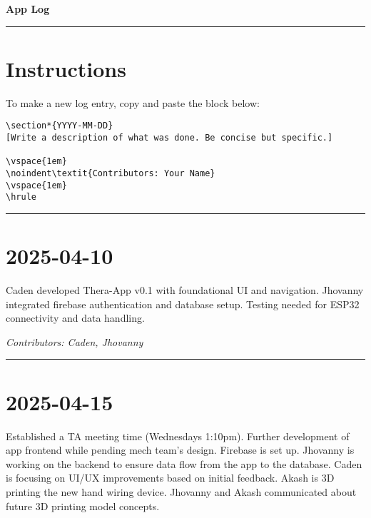 \documentclass[12pt]{article}
\begin{document}
\begin{center}
    {\Huge\bfseries App Log}
\end{center}
\vspace{1em}
\hrule
\vspace{1em}

\section*{Instructions}
To make a new log entry, copy and paste the block below:

\begin{verbatim}
\section*{YYYY-MM-DD}
[Write a description of what was done. Be concise but specific.]

\vspace{1em}
\noindent\textit{Contributors: Your Name}
\vspace{1em}
\hrule
\end{verbatim}

\vspace{1em}
\hrule
\vspace{1em}


\section*{2025-04-10}
Caden developed Thera-App v0.1 with foundational UI and navigation. Jhovanny integrated firebase authentication and database setup. Testing needed for ESP32 connectivity and data handling.

\vspace{1em}
\noindent\textit{Contributors: Caden, Jhovanny}
\vspace{1em}
\hrule

\section*{2025-04-15}
Established a TA meeting time (Wednesdays 1:10pm). Further development of app frontend while pending mech team's design. Firebase is set up. Jhovanny is working on the backend to ensure data flow from the app to the database. Caden is focusing on UI/UX improvements based on initial feedback.
Akash is 3D printing the new hand wiring device. Jhovanny and Akash communicated about future 3D printing model concepts.
\end{document}
